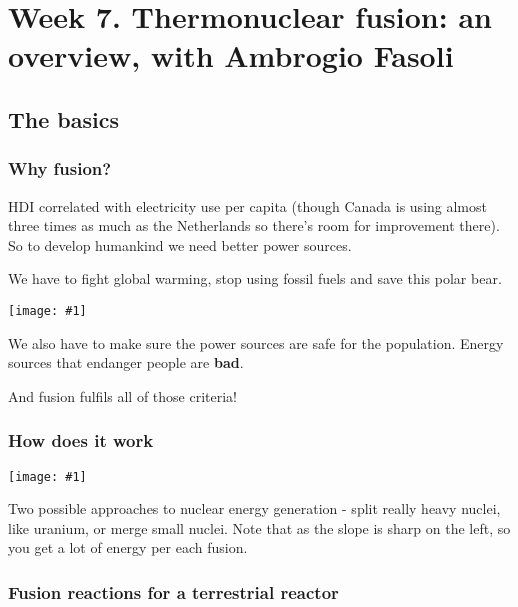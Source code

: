 \documentclass[PlasmaNotes.tex]{subfiles}
\begin{document}
\setcounter{section}{6}
\let\oldexp\exp
\renewcommand{\exp}[1]{\oldexp(#1)}
\newcommand{\png}[1]{\begin{center}\texttt{[image: \#1]}\end{center}}
\newcommand{\largepng}[1]{\begin{center}\texttt{[image: \#1]}\end{center}}
\newcommand{\goesto}{\rightarrow}
\section{Week 7. Thermonuclear fusion: an overview, with Ambrogio Fasoli}

\subsection{The basics}

\subsubsection{Why fusion?}

HDI correlated with electricity use per capita (though Canada is using almost three times as much as the Netherlands so there's room for improvement there). So to develop humankind we need better power sources.

We have to fight global warming, stop using fossil fuels and save this polar bear.

\png{thisbear.PNG}

We also have to make sure the power sources are safe for the population. Energy sources that endanger people are \textbf{bad}.

And fusion fulfils all of those criteria!

\subsubsection{How does it work}

\png{bindingenergycurve.PNG}

Two possible approaches to nuclear energy generation - split really heavy nuclei, like uranium, or merge small nuclei. Note that as the slope is sharp on the left, so you get a lot of energy per each fusion.

\subsubsection{Fusion reactions for a terrestrial reactor}
\end{document}
